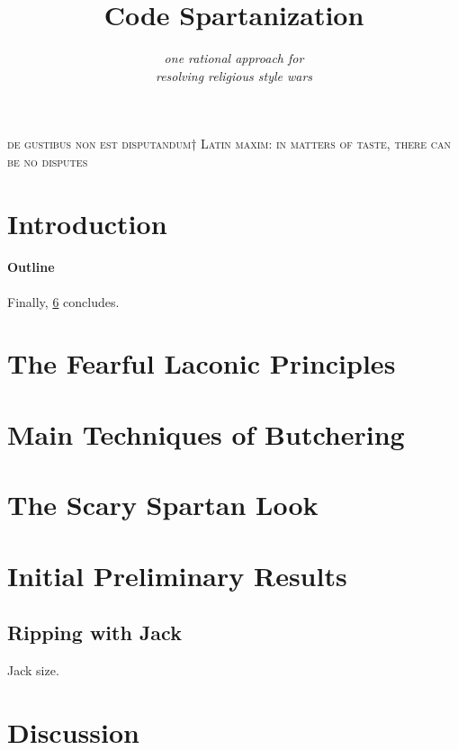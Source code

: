 \documentclass[preprint,10pt,nonatbib]{sigplanconf}
\title{Code Spartanization}
\subtitle{\scriptsize \emph{one rational approach for\\ resolving religious style wars}}
\begin{document}
\textsc{de gustibus non est disputandum†{%
    Latin maxim: in matters of taste, there can be no disputes
}}
{\let\newpage\relax\maketitle}

\begin{abstract}
  
\end{abstract}

\section{Introduction}


\paragraph{Outline}
\label{section:principia}
\label{section:techniques}
\label{section:look}
\label{section:jack}
\label{section:look}
\label{section:initial}
\label{section:zz}
Finally, \cref{section:zz} concludes.

\section{The Fearful Laconic Principles}
\label{section:principia}


\section{Main Techniques of Butchering}
\label{section:techniques}


\section{The Scary Spartan Look}
\label{section:look}


\section{Initial Preliminary Results}
\label{section:initial}


\subsection{Ripping with Jack}
\label{section:jack}

Jack size.

\section{Discussion}
\label{section:zz}

\balance
\small

\end{document}
